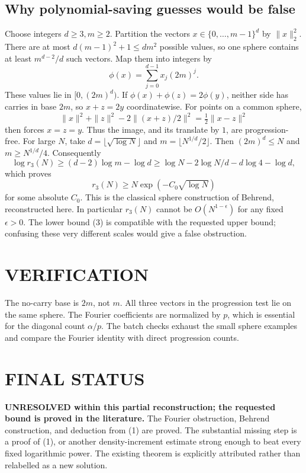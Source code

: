 \subsection*{Why polynomial-saving guesses would be false}
Choose integers $d\ge3,m\ge2$. Partition the vectors
$x\in\{0,\ldots,m-1\}^d$ by $\|x\|_2^2$. There are at most
$d(m-1)^2+1\le dm^2$ possible values, so one sphere contains at least
$m^{d-2}/d$ such vectors. Map them into integers by
\[
 \phi(x)=\sum_{j=0}^{d-1}x_j(2m)^j.
\]
These values lie in $[0,(2m)^d)$. If
$\phi(x)+\phi(z)=2\phi(y)$, neither side has carries in base $2m$,
so $x+z=2y$ coordinatewise. For points on a common sphere,
\[
 \|x\|^2+\|z\|^2-2\|(x+z)/2\|^2=\tfrac12\|x-z\|^2
\]
then forces $x=z=y$. Thus the image, and its translate by $1$, are
progression-free.
For large $N$, take $d=\lfloor\sqrt{\log N}\rfloor$ and
$m=\lfloor N^{1/d}/2\rfloor$. Then $(2m)^d\le N$ and
$m\ge N^{1/d}/4$. Consequently
\[
 \log r_3(N)\ge(d-2)\log m-\log d
 \ge\log N-2\log N/d-d\log4-\log d,
\]
which proves
\[
 r_3(N)\ge N\exp(-C_0\sqrt{\log N})                     \tag{3}
\]
for some absolute $C_0$. This is the classical sphere construction of
Behrend, reconstructed here. In particular $r_3(N)$ cannot be
$O(N^{1-\epsilon})$ for any fixed $\epsilon>0$.
The lower bound (3) is compatible with the requested upper bound;
confusing these very different scales would give a false obstruction.

\section{VERIFICATION}
The no-carry base is $2m$, not $m$. All three vectors in the progression
test lie on the same sphere. The Fourier coefficients are normalized
by $p$, which is essential for the diagonal count $\alpha/p$.
The batch checks exhaust the small sphere examples and compare the
Fourier identity with direct progression counts.

\section{FINAL STATUS}
\textbf{UNRESOLVED within this partial reconstruction; the requested
bound is proved in the literature.}
The Fourier obstruction, Behrend construction, and deduction from (1)
are proved. The substantial missing step is a proof of (1), or another
density-increment estimate strong enough to beat every fixed logarithmic
power. The existing theorem is explicitly attributed rather than
relabelled as a new solution.


